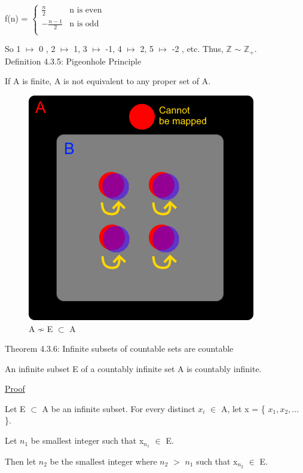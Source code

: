 	\hspace{0.5cm} f(n) = 
	$
	\begin{cases}
		\frac{n}{2} & \text{n is even} \\
		-\frac{n-1}{2} & \text{n is odd} \\
	\end{cases}
	$

	So 1 $\mapsto$ 0 , 2 $\mapsto$ 1, 3 $\mapsto$ -1, 4 $\mapsto$ 2, 5 $\mapsto$ -2 , etc.
	Thus, $\mathbb{Z}$ $\sim$ $\mathbb{Z}_+$. \\ 

{ \color{blue} Definition 4.3.5: Pigeonhole Principle } 

	\qquad If A is finite, A is not equivalent to any proper set of A.

\begin{figure}[h]
	\centering
	\includegraphics[scale=0.6]{Images/4.3.5.png}
	\caption{A $\not \sim$ E $\subset$ A}
\end{figure}

{ \color{red} Theorem 4.3.6: Infinite subsets of countable sets are countable } 

	\qquad An infinite subset E of a countably infinite set A is countably infinite.

{ \color{magenta} \underline{Proof} } 

	Let E $\subset$ A be an infinite subset.
	For every distinct $x_i$ $\in$ A, let x = \{ $x_1, x_2, ...$ \}.

	Let $n_1$ be smallest integer such that x$_{n_1}$ $\in$ E.

	Then let $n_2$ be the smallest integer where $n_2$ $>$ $n_1$ such that x$_{n_2}$ $\in$ E.

